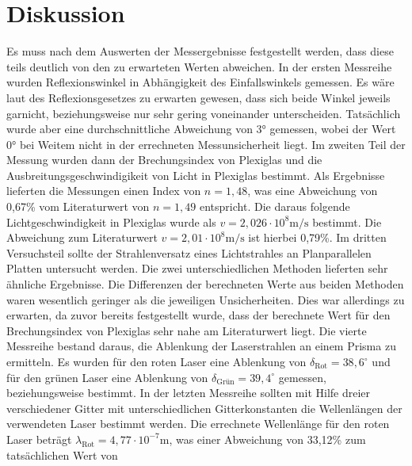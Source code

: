 \section{Diskussion}
\label{sec:Diskussion}

Es muss nach dem Auswerten der Messergebnisse festgestellt werden, dass diese teils deutlich von den zu erwarteten Werten abweichen.
\newline \newline
In der ersten Messreihe wurden Reflexionswinkel in Abhängigkeit des Einfallswinkels gemessen. Es wäre laut des Reflexionsgesetzes zu erwarten gewesen, dass sich beide
Winkel jeweils garnicht, beziehungsweise nur sehr gering voneinander unterscheiden. Tatsächlich wurde aber eine durchschnittliche Abweichung von 3° gemessen, wobei
der Wert 0° bei Weitem nicht in der errechneten Messunsicherheit liegt. 
\newline 
Im zweiten Teil der Messung wurden dann der Brechungsindex von Plexiglas und die Ausbreitungsgeschwindigikeit von Licht in Plexiglas bestimmt. Als Ergebnisse lieferten
die Messungen einen Index von $n = 1,48$, was eine Abweichung von 0,67\% vom Literaturwert von $n = 1,49$ entspricht. Die daraus folgende Lichtgeschwindigkeit in Plexiglas wurde als
$v = 2,026 \cdot 10^8 \si{\meter\per\second}$ bestimmt. Die Abweichung zum Literaturwert $v = 2,01 \cdot 10^8 \si{\meter\per\second}$ ist hierbei 0,79\%.
\newline
Im dritten Versuchsteil sollte der Strahlenversatz eines Lichtstrahles an Planparallelen Platten untersucht werden. Die zwei unterschiedlichen Methoden lieferten sehr ähnliche
Ergebnisse. Die Differenzen der berechneten Werte aus beiden Methoden waren wesentlich geringer als die jeweiligen Unsicherheiten. Dies war allerdings zu erwarten, da zuvor bereits
festgestellt wurde, dass der berechnete Wert für den Brechungsindex von Plexiglas sehr nahe am Literaturwert liegt.
\newline
Die vierte Messreihe bestand daraus, die Ablenkung der Laserstrahlen an einem Prisma zu ermitteln. Es wurden für den roten Laser eine Ablenkung von
$\delta_\text{Rot} = 38,6^{\circ}$ und für den grünen Laser eine Ablenkung von $\delta_\text{Grün} = 39,4^{\circ}$ gemessen, beziehungsweise
bestimmt.
\newline 
In der letzten Messreihe sollten mit Hilfe dreier verschiedener Gitter mit unterschiedlichen Gitterkonstanten die Wellenlängen der verwendeten Laser bestimmt werden. Die errechnete
Wellenlänge für den roten Laser beträgt $\lambda_\text{Rot} = 4,77 \cdot 10^{-7} \si{\meter}$, was einer Abweichung von 33,12\% zum tatsächlichen Wert von
